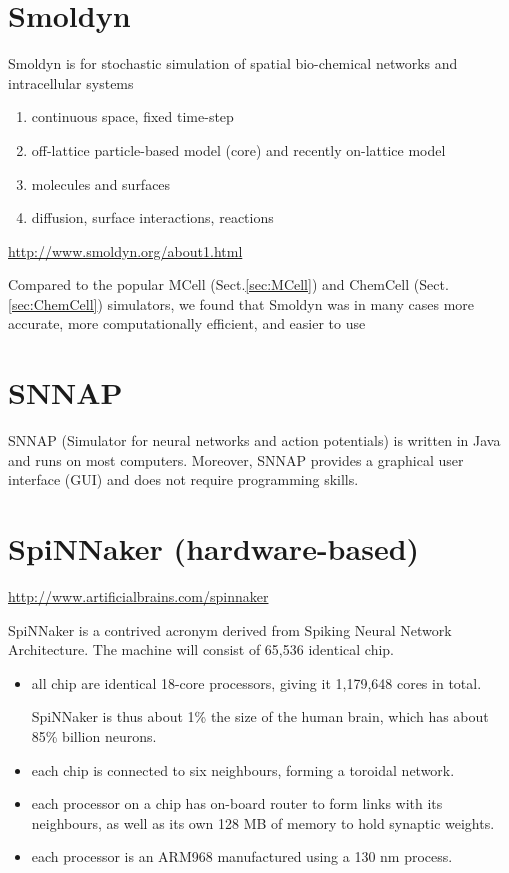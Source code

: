 \section{Smoldyn}
\label{sec:Smoldyn}

Smoldyn is for stochastic simulation of spatial bio-chemical networks and
intracellular systems
\begin{enumerate}
  \item continuous space, fixed time-step

  \item off-lattice particle-based model (core)
  and recently on-lattice model
  
  
  \item molecules and surfaces 
  
  \item diffusion, surface interactions, reactions
\end{enumerate}
\url{http://www.smoldyn.org/about1.html}

Compared to the popular MCell (Sect.\ref{sec:MCell}) and ChemCell
(Sect.\ref{sec:ChemCell}) simulators, we found that Smoldyn was in many cases
more accurate, more computationally efficient, and easier to use


\section{SNNAP}
\label{sec:SNNAP}

SNNAP (Simulator for neural networks and action potentials) is written in Java
and runs on most computers. Moreover, SNNAP provides a graphical user interface
(GUI) and does not require programming skills.

\section{SpiNNaker (hardware-based)}
\label{sec:SpiNNaker}


\url{http://www.artificialbrains.com/spinnaker}

SpiNNaker is a contrived acronym derived from Spiking Neural Network
Architecture. The machine will consist of 65,536 identical chip.
\begin{itemize}
  \item all chip are identical 18-core processors, giving it 1,179,648 cores in
  total.
  
  SpiNNaker is thus about 1\% the size of the human brain, which has about 85\%
  billion neurons.
  
  \item each chip is connected to six neighbours, forming a toroidal
  network.
  
  \item each processor on a chip has on-board router to form links with its
  neighbours, as well as its own 128 MB of memory to hold synaptic weights.
  
  \item each processor is an ARM968 manufactured using a 130 nm process.
  
\end{itemize}

